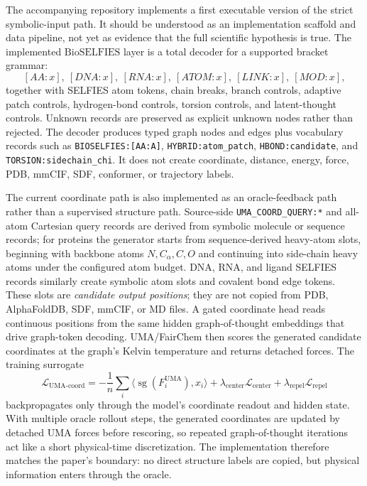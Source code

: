 \documentclass[11pt]{article}
\newcommand{\bioselfies}{\mathrm{BioSELFIES}}
\begin{document}
The accompanying repository implements a first executable version of the strict symbolic-input path. It should be understood as an implementation scaffold and data pipeline, not yet as evidence that the full scientific hypothesis is true. The implemented \(\bioselfies\) layer is a total decoder for a supported bracket grammar:
\[
[AA:x],\ [DNA:x],\ [RNA:x],\ [ATOM:x],\ [LINK:x],\ [MOD:x],
\]
together with SELFIES atom tokens, chain breaks, branch controls, adaptive patch controls, hydrogen-bond controls, torsion controls, and latent-thought controls. Unknown records are preserved as explicit unknown nodes rather than rejected. The decoder produces typed graph nodes and edges plus vocabulary records such as \texttt{BIOSELFIES:[AA:A]}, \texttt{HYBRID:atom\_patch}, \texttt{HBOND:candidate}, and \texttt{TORSION:sidechain\_chi}. It does not create coordinate, distance, energy, force, PDB, mmCIF, SDF, conformer, or trajectory labels.

The current coordinate path is also implemented as an oracle-feedback path rather than a supervised structure path. Source-side \texttt{UMA\_COORD\_QUERY:*} and all-atom Cartesian query records are derived from symbolic molecule or sequence records; for proteins the generator starts from sequence-derived heavy-atom slots, beginning with backbone atoms \(N,C_\alpha,C,O\) and continuing into side-chain heavy atoms under the configured atom budget. DNA, RNA, and ligand SELFIES records similarly create symbolic atom slots and covalent bond edge tokens. These slots are \emph{candidate output positions}; they are not copied from PDB, AlphaFoldDB, SDF, mmCIF, or MD files. A gated coordinate head reads continuous positions from the same hidden graph-of-thought embeddings that drive graph-token decoding. UMA/FairChem then scores the generated candidate coordinates at the graph's Kelvin temperature and returns detached forces. The training surrogate
\[
\mathcal{L}_{\mathrm{UMA\text{-}coord}}
=-\frac{1}{n}\sum_i \langle \operatorname{sg}(F_i^{\mathrm{UMA}}),x_i\rangle
+\lambda_{\mathrm{center}}\mathcal{L}_{\mathrm{center}}
+\lambda_{\mathrm{repel}}\mathcal{L}_{\mathrm{repel}}
\]
backpropagates only through the model's coordinate readout and hidden state. With multiple oracle rollout steps, the generated coordinates are updated by detached UMA forces before rescoring, so repeated graph-of-thought iterations act like a short physical-time discretization. The implementation therefore matches the paper's boundary: no direct structure labels are copied, but physical information enters through the oracle.
\end{document}
